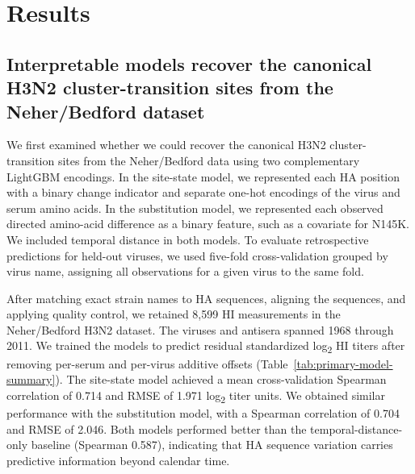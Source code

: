 \documentclass[12pt]{article}
\begin{document}
\section{Results}

\subsection{Interpretable models recover the canonical H3N2 cluster-transition sites from the Neher/Bedford dataset}

We first examined whether we could recover the canonical H3N2 cluster-transition sites from the Neher/Bedford data using two complementary LightGBM encodings. In the site-state model, we represented each HA position with a binary change indicator and separate one-hot encodings of the virus and serum amino acids. In the substitution model, we represented each observed directed amino-acid difference as a binary feature, such as a covariate for N145K. We included temporal distance in both models. To evaluate retrospective predictions for held-out viruses, we used five-fold cross-validation grouped by virus name, assigning all observations for a given virus to the same fold.

After matching exact strain names to HA sequences, aligning the sequences, and applying quality control, we retained 8{,}599 HI measurements in the Neher/Bedford H3N2 dataset. The viruses and antisera spanned 1968 through 2011. We trained the models to predict residual standardized log\textsubscript{2} HI titers after removing per-serum and per-virus additive offsets (Table~\ref{tab:primary-model-summary}). The site-state model achieved a mean cross-validation Spearman correlation of 0.714 and RMSE of 1.971 log\textsubscript{2} titer units. We obtained similar performance with the substitution model, with a Spearman correlation of 0.704 and RMSE of 2.046. Both models performed better than the temporal-distance-only baseline (Spearman 0.587), indicating that HA sequence variation carries predictive information beyond calendar time.
\end{document}
